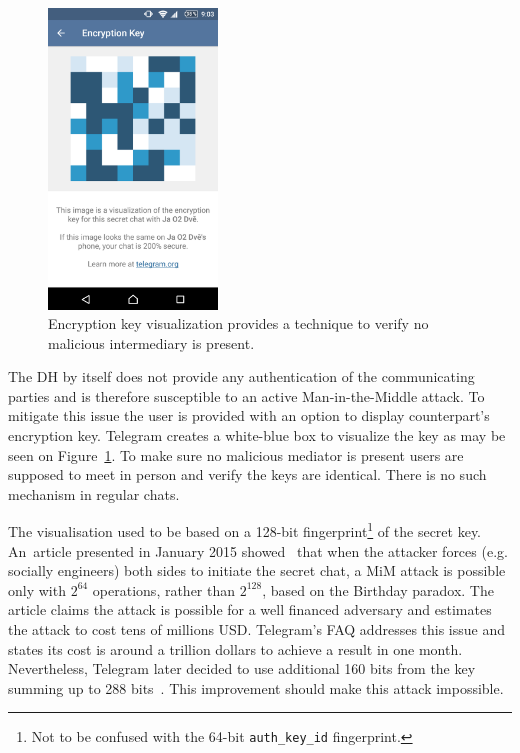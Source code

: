 \documentclass[thesis=M,english]{FITthesis}[2012/10/20]
\begin{document}
\begin{figure}[htb]
	\centering
	\includegraphics[width=0.4\textwidth]{telegram-keybox.png}
	\caption[Encryption key visualization]{Encryption key visualization provides a technique to verify no malicious intermediary is present.}
	\label{img:telegram-keybox}
\end{figure}

The DH by itself does not provide any authentication of the communicating parties and is therefore susceptible to an active Man-in-the-Middle attack. To mitigate this issue the user is provided with an option to display counterpart's encryption key. Telegram creates a white-blue box to visualize the key as may be seen on Figure~\ref{img:telegram-keybox}. To make sure no malicious mediator is present users are supposed to meet in person and verify the keys are identical. There is no such mechanism in regular chats.

The visualisation used to be based on a 128-bit fingerprint\footnote{Not to be confused with the 64-bit \texttt{auth\_key\_id} fingerprint.} of the secret key. An~article presented in January 2015 showed~\cite{telegram-264} that when the attacker forces (e.g. socially engineers) both sides to initiate the secret chat, a MiM attack is possible only with $2^{64}$ operations, rather than $2^{128}$, based on the Birthday paradox. The article claims the attack is possible for a well financed adversary and estimates the attack to cost tens of millions USD. Telegram's FAQ addresses this issue and states its cost is around a trillion dollars to achieve a result in one month. Nevertheless, Telegram later decided to use additional 160 bits from the key summing up to 288 bits~\cite{telegram-techfaq}. This improvement should make this attack impossible.
\end{document}
